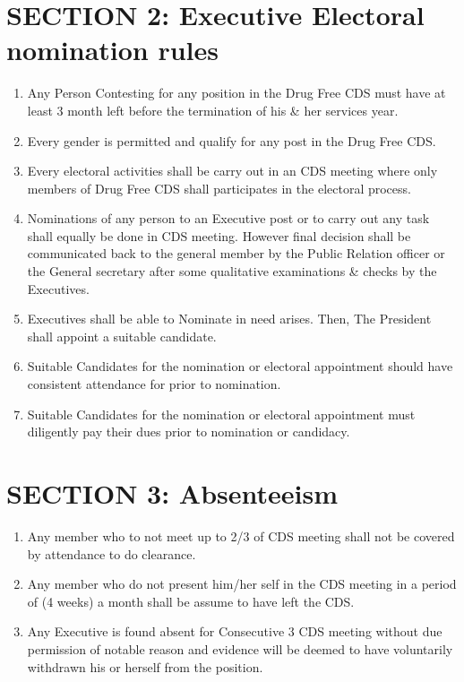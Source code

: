 \documentclass{report}
\begin{document}
\section{SECTION 2: Executive Electoral nomination rules}
\begin{enumerate}[label = \Alph*. ] 
    \item Any Person Contesting for any position in the Drug Free CDS must have at least 3 month left before the termination of his & her services year.
    
    \item Every gender is permitted and qualify for any post in the Drug Free CDS.
    
    \item Every electoral activities shall be carry out in an CDS meeting where only members of Drug Free CDS shall participates in the electoral process.
    
    \item Nominations of any person to an Executive post or to carry out any task shall equally be done in CDS meeting. However final decision shall be communicated back to the general member by the Public Relation officer or the General secretary after some qualitative examinations & checks by the Executives. 
    
    \item Executives shall be able to Nominate in need arises. Then, The President shall appoint a suitable candidate.
    
    \item Suitable Candidates for the nomination or electoral appointment should have consistent attendance for prior to nomination.
    
    \item Suitable Candidates for the nomination or electoral appointment must diligently pay their dues prior to nomination or candidacy.
\end{enumerate}

\section{SECTION 3: Absenteeism}
\begin{enumerate}[label = \Alph*. ] 
    \item Any member who to not meet up to 2/3 of CDS meeting shall not be covered by attendance to do clearance.
    
    \item Any member who do not present him/her self in the CDS meeting in a period of (4 weeks) a month shall be  assume to have left the CDS.
    
    \item Any Executive is found absent for Consecutive 3 CDS meeting  without due permission of notable reason and evidence will be deemed to have voluntarily withdrawn his or herself from the position.
\end{enumerate}
\end{document}
